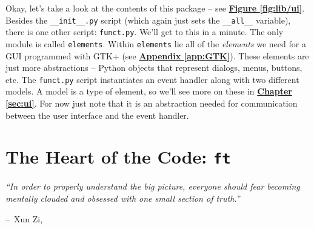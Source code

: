 \documentclass{report}
\makeatletter
\newenvironment{chapquote}[2][2em]
  {\setlength{\@tempdima}{#1}%
   \def\chapquote@author{#2}%
   \parshape 1 \@tempdima \dimexpr\textwidth-2\@tempdima\relax%
   \itshape}
  {\par\normalfont\hfill--\ \chapquote@author\hspace*{\@tempdima}\par\bigskip}
\makeatother
\begin{document}
Okay, let's take a look at the contents of this package -- see \hyperref[fig:lib/ui]{\textbf{Figure \ref{fig:lib/ui}}}. Besides the \texttt{\_\_init\_\_.py} script (which again just sets the \texttt{\_\_all\_\_} variable), there is one other script: \texttt{funct.py}. We'll get to this in a minute. The only module is called \texttt{elements}. Within \texttt{elements} lie all of the \textit{elements} we need for a GUI programmed with GTK+ (see \hyperref[sec:GTK]{\textbf{Appendix \ref{app:GTK}}}). These elements are just more abstractions -- Python objects that represent dialogs, menus, buttons, etc. The \texttt{funct.py} script instantiates an event handler along with two different models. A model is a type of element, so we'll see more on these in \hyperref[sec:ui]{\textbf{Chapter \ref{sec:ui}}}. For now just note that it is an abstraction needed for communication between the user interface and the event handler.\\

	\begin{minipage}{\linewidth}
		\label{fig:lib/ui}
	\end{minipage}

\chapter{The Heart of the Code: \texttt{ft}}
\begin{chapquote}{Xun Zi, \textit{}}
``In order to properly understand the big picture, everyone should fear becoming mentally clouded and obsessed with one small section of truth.''
\end{chapquote}

\end{document}
